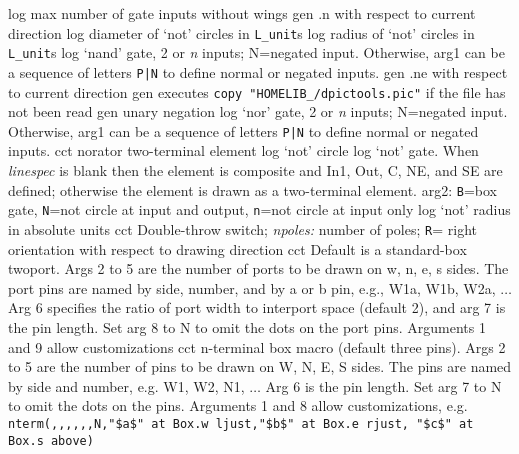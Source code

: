   {log}
  {max number of gate inputs without wings}
  {gen}
  {.n with respect to current direction}
  {log}
  {diameter of `not' circles in {\tt L\_unit}s}
  {log}
  {radius of `not' circles in {\tt L\_unit}s}
  {log}
  {`nand' gate, 2 or {\sl n\/} inputs; N=negated input.
   Otherwise, arg1 can be a sequence of letters {\tt P|N}
   to define normal or negated inputs.
    }
  {gen}
  {.ne with respect to current direction}
  {gen}
  {executes {\tt copy "HOMELIB\_/dpictools.pic"} if the file has not been read}
  {gen}
  {unary negation}
  {log}
  {`nor' gate, 2 or {\sl n\/} inputs; N=negated input.
   Otherwise, arg1 can be a sequence of letters {\tt P|N}
   to define normal or negated inputs.
    }
  {cct}
  { norator two-terminal element }
  {log}
  {`not' circle}
  {log}
  {`not' gate.
   When {\sl linespec} is blank then the element is composite and In1,
   Out, C, NE, and SE are defined; otherwise the element is drawn as
   a two-terminal element. arg2: {\tt B}=box gate, {\tt N}=not circle at input
   and output, {\tt n}=not circle at input only 
    }
  {log}
  {`not' radius in absolute units}
  {cct}
  {Double-throw switch; {\sl npoles:} number of poles;
   {\tt R}= right orientation with respect to drawing direction
   }
  {cct}
  { Default is a standard-box twoport.  Args 2 to 5 are
    the number of ports to be drawn on w, n, e, s sides.
    The port pins are named by side, number, and by a or b pin,
    e.g., W1a, W1b, W2a, $\ldots$
    Arg 6 specifies the ratio of port width to interport space (default 2),
    and arg 7 is the pin length.  Set arg 8 to N to omit the dots on
    the port pins. Arguments 1 and 9 allow customizations
   }
  {cct}
  {n-terminal box macro (default three pins).
   Args 2 to 5 are the number of pins to be drawn on W, N, E, S sides.
   The pins are named by side and number, e.g. W1, W2, N1, $\ldots$
   Arg 6 is the pin length.  Set arg 7 to N to omit the dots
   on the pins. Arguments 1 and 8 allow customizations, e.g.
   {\tt nterm(,{,},{,},{,}N,"\$a\$" at Box.w ljust,"\$b\$" at Box.e rjust,
      "\$c\$" at Box.s above)} }
